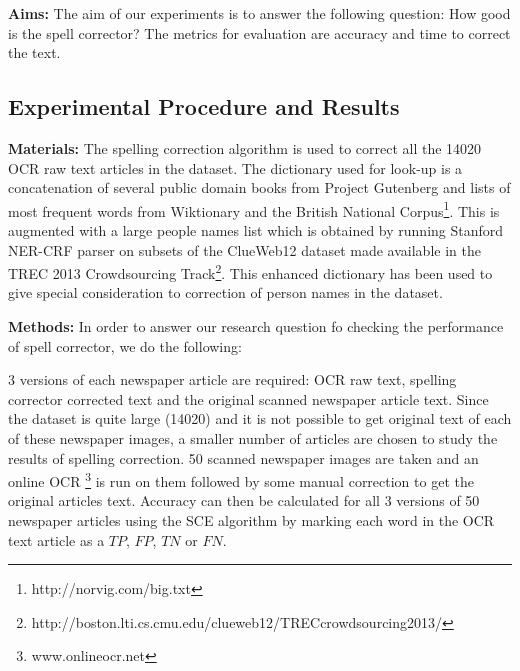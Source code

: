 \documentclass[12pt]{article}
\begin{document}
\noindent \textbf{Aims: }The aim of our experiments is to answer the following question:
How good is the spell corrector? The metrics for evaluation are accuracy and time to correct the text.
 


\subsection{Experimental Procedure and Results}
\noindent \textbf{Materials: }
The spelling correction algorithm is used to correct all the 14020 OCR raw text articles in the dataset. The dictionary used for look-up is a concatenation of several public domain books from Project Gutenberg and lists of most frequent words from Wiktionary and the British National Corpus\footnote{http://norvig.com/big.txt}. This is augmented with a large people names list which is obtained  by running Stanford NER-CRF parser on subsets of the ClueWeb12 dataset made available in the TREC 2013 Crowdsourcing Track\footnote{http://boston.lti.cs.cmu.edu/clueweb12/TRECcrowdsourcing2013/}. This enhanced dictionary has been used to give special consideration to correction of person names in the dataset.

\noindent \textbf{Methods: }
In order to answer our research question fo checking the performance of spell corrector, we do the following: 

3 versions of each newspaper article are required: OCR raw text, spelling corrector corrected text and the original scanned newspaper article text. Since the dataset is quite large (14020) and it is not possible to get original text of each of these newspaper images, a smaller number of articles are chosen to study the results of spelling correction. 50 scanned newspaper images are taken and an online OCR \footnote{www.onlineocr.net} is run on them followed by some manual correction to get the original articles text. Accuracy can then be calculated for all 3 versions of 50 newspaper articles using the SCE algorithm by marking each word in the OCR text article as a $TP$, $FP$, $TN$ or $FN$. 

\end{document}
